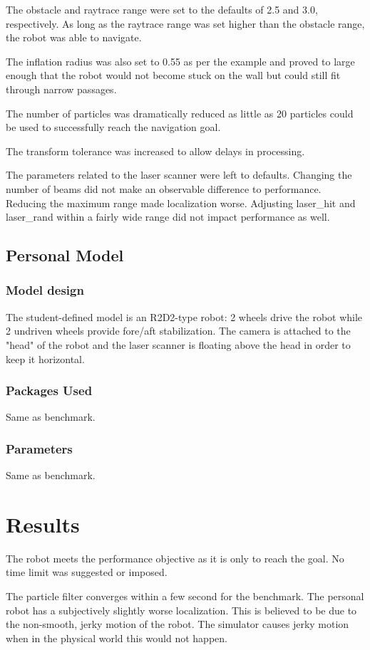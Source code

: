\documentclass[10pt,journal,compsoc]{IEEEtran}
\begin{document}
The obstacle and raytrace range were set to the defaults of 2.5 and 3.0, respectively. As long as the raytrace range was set higher than the obstacle range, the robot was able to navigate.

The inflation radius was also set to 0.55 as per the example and proved to large enough that the robot would not become stuck on the wall but could still fit through narrow passages.

The number of particles was dramatically reduced as little as 20 particles could be used to successfully reach the navigation goal.

The transform tolerance was increased to allow delays in processing.

The parameters related to the laser scanner were left to defaults. Changing the number of beams did not make an observable difference to performance. Reducing the maximum range made localization worse. Adjusting laser\_hit and laser\_rand within a fairly wide range did not impact performance as well.

\subsection{Personal Model}
\subsubsection{Model design}
The student-defined model is an R2D2-type robot: 2 wheels drive the robot while 2 undriven wheels provide fore/aft stabilization. The camera is attached to the "head" of the robot and the laser scanner is floating above the head in order to keep it horizontal.
\subsubsection{Packages Used}
Same as benchmark.
\subsubsection{Parameters}
Same as benchmark.

\section{Results}
The robot meets the performance objective as it is only to reach the goal. No time limit was suggested or imposed.

The particle filter converges within a few second for the benchmark. The personal robot has a subjectively slightly worse localization. This is believed to be due to the non-smooth, jerky motion of the robot. The simulator causes jerky motion when in the physical world this would not happen.
\end{document}
